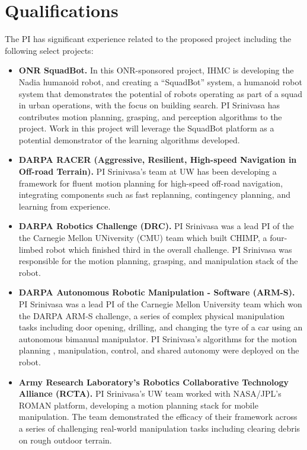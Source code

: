 \documentclass[10pt]{article}
\begin{document}
\section{Qualifications}
The PI has significant experience related to the proposed project including the following select projects:
\begin{itemize}
    \item \textbf{ONR SquadBot.} In this ONR-sponsored project, IHMC is developing the Nadia humanoid robot, and creating a “SquadBot” system, a humanoid robot system that demonstrates the potential of robots operating as part of a squad in urban operations, with the focus on building search. PI Srinivasa has contributes motion planning, grasping, and perception algorithms to the project. Work in this project will leverage the SquadBot platform as a potential demonstrator of the learning algorithms developed.
    \item \textbf{DARPA RACER (Aggressive, Resilient, High-speed Navigation in Off-road Terrain).} PI Srinivasa’s team at UW has been developing a framework for fluent motion planning for high-speed off-road navigation, integrating components such as fast replanning, contingency planning, and learning from experience.
    \item \textbf{DARPA Robotics Challenge (DRC).} PI Srinivasa was a lead PI of the the Carnegie Mellon UNiversity (CMU) team which built CHIMP, a four-limbed robot  which finished third in the overall challenge. PI Srinivasa was responsible for the motion planning, grasping, and manipulation stack of the robot.
    \item \textbf{DARPA Autonomous Robotic Manipulation - Software (ARM-S).} PI Srinivasa was a lead PI of the Carnegie Mellon University team which won the DARPA ARM-S challenge, a series of complex physical manipulation tasks including door opening, drilling, and changing the tyre of a car using an autonomous bimanual manipulator. PI Srinivasa's algorithms for the motion planning , manipulation, control, and shared autonomy were deployed on the robot.
    \item \textbf{Army Research Laboratory’s Robotics Collaborative Technology Alliance (RCTA).} PI Srinivasa’s UW team worked with NASA/JPL’s ROMAN platform, developing a motion planning stack for mobile manipulation. The team demonstrated the efficacy of their framework across a series of challenging real-world manipulation tasks including clearing debris on rough outdoor terrain. 
\end{itemize}

\newpage
 

\end{document}
